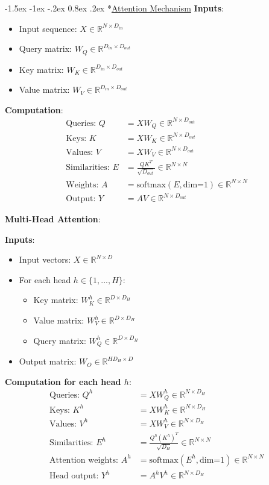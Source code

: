 \documentclass{article}
\makeatletter
\renewcommand\section{\@startsection{section}{1}{\z@}%
                                  {-1.5ex \@plus -1ex \@minus -.2ex}%
                                  {0.8ex \@plus.2ex}%
                                  {\normalfont\small\bfseries}}
\makeatother
\begin{document}
\begin{multicols}{3}
\section*{\underline{Attention Mechanism}}
\textbf{Inputs}:
\begin{itemize}
\item Input sequence: $X \in \mathbb{R}^{N \times D_{in}}$
\item Query matrix: $W_Q \in \mathbb{R}^{D_{in} \times D_{out}}$
\item Key matrix: $W_K \in \mathbb{R}^{D_{in} \times D_{out}}$
\item Value matrix: $W_V \in \mathbb{R}^{D_{in} \times D_{out}}$
\end{itemize}

\textbf{Computation}:
\begin{align*}
\text{Queries: } Q &= XW_Q \in \mathbb{R}^{N \times D_{out}}\\
\text{Keys: } K &= XW_K \in \mathbb{R}^{N \times D_{out}}\\
\text{Values: } V &= XW_V \in \mathbb{R}^{N \times D_{out}}\\
\text{Similarities: } E &= \frac{QK^T}{\sqrt{D_{out}}} \in \mathbb{R}^{N \times N}\\
\text{Weights: } A &= \text{softmax}(E, \text{dim=1}) \in \mathbb{R}^{N \times N}\\
\text{Output: } Y &= AV \in \mathbb{R}^{N \times D_{out}}
\end{align*}

\textbf{Multi-Head Attention}:

\textbf{Inputs}:
\begin{itemize}
\item Input vectors: $X \in \mathbb{R}^{N \times D}$
\item For each head $h \in \{1,...,H\}$:
  \begin{itemize}
  \item Key matrix: $W_K^h \in \mathbb{R}^{D \times D_H}$
  \item Value matrix: $W_V^h \in \mathbb{R}^{D \times D_H}$
  \item Query matrix: $W_Q^h \in \mathbb{R}^{D \times D_H}$
  \end{itemize}
\item Output matrix: $W_O \in \mathbb{R}^{HD_H \times D}$
\end{itemize}

\textbf{Computation for each head $h$}:
\begin{align*}
\text{Queries: } Q^h &= XW_Q^h \in \mathbb{R}^{N \times D_H}\\
\text{Keys: } K^h &= XW_K^h \in \mathbb{R}^{N \times D_H}\\
\text{Values: } V^h &= XW_V^h \in \mathbb{R}^{N \times D_H}\\
\text{Similarities: } E^h &= \frac{Q^h(K^h)^T}{\sqrt{D_H}} \in \mathbb{R}^{N \times N}\\
\text{Attention weights: } A^h &= \text{softmax}(E^h, \text{dim=1}) \in \mathbb{R}^{N \times N}\\
\text{Head output: } Y^h &= A^hV^h \in \mathbb{R}^{N \times D_H}
\end{align*}


\end{multicols}
\end{document}
